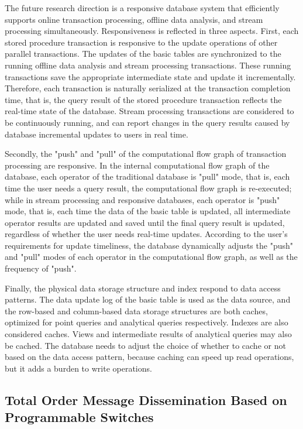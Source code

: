 The future research direction is a responsive database system that efficiently supports online transaction processing, offline data analysis, and stream processing simultaneously. Responsiveness is reflected in three aspects. First, each stored procedure transaction is responsive to the update operations of other parallel transactions. The updates of the basic tables are synchronized to the running offline data analysis and stream processing transactions. These running transactions save the appropriate intermediate state and update it incrementally. Therefore, each transaction is naturally serialized at the transaction completion time, that is, the query result of the stored procedure transaction reflects the real-time state of the database. Stream processing transactions are considered to be continuously running, and can report changes in the query results caused by database incremental updates to users in real time.

Secondly, the "push" and "pull" of the computational flow graph of transaction processing are responsive. In the internal computational flow graph of the database, each operator of the traditional database is "pull" mode, that is, each time the user needs a query result, the computational flow graph is re-executed; while in stream processing and responsive databases, each operator is "push" mode, that is, each time the data of the basic table is updated, all intermediate operator results are updated and saved until the final query result is updated, regardless of whether the user needs real-time updates. According to the user's requirements for update timeliness, the database dynamically adjusts the "push" and "pull" modes of each operator in the computational flow graph, as well as the frequency of "push".

Finally, the physical data storage structure and index respond to data access patterns.
The data update log of the basic table is used as the data source, and the row-based and column-based data storage structures are both caches, optimized for point queries and analytical queries respectively. Indexes are also considered caches. Views and intermediate results of analytical queries may also be cached.
The database needs to adjust the choice of whether to cache or not based on the data access pattern, because caching can speed up read operations, but it adds a burden to write operations.

\iffalse
\subsection{Total Order Message Dissemination Based on Programmable Switches}

